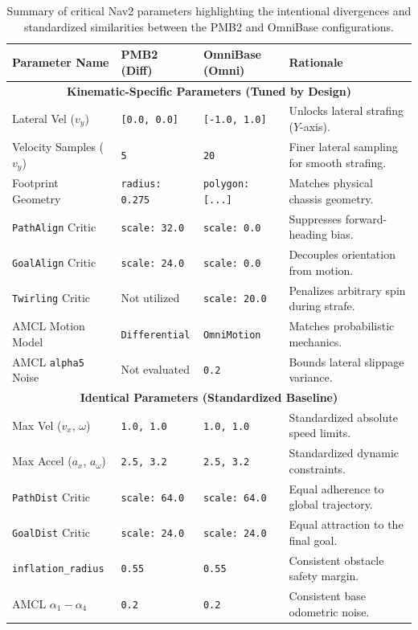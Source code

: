 \begin{table}[htbp]
    \centering
    \renewcommand{\arraystretch}{1.3}
    \caption{Summary of critical Nav2 parameters highlighting the intentional divergences and standardized similarities between the PMB2 and OmniBase configurations.}
    \vspace{0.2cm}
    \label{tab:nav2_params}
    \begin{tabularx}{\textwidth}{@{} l l l >{\raggedright\arraybackslash}X @{}}
        \toprule
        \textbf{Parameter Name} & \textbf{PMB2 (Diff)} & \textbf{OmniBase (Omni)} & \textbf{Rationale} \\
        \midrule
        \multicolumn{4}{c}{\textbf{Kinematic-Specific Parameters (Tuned by Design)}} \\
        \midrule
        Lateral Vel ($v_y$) & \texttt{[0.0, 0.0]} & \texttt{[-1.0, 1.0]} & Unlocks lateral strafing ($Y$-axis). \\
        Velocity Samples ($v_y$) & \texttt{5} & \texttt{20} & Finer lateral sampling for smooth strafing. \\
        Footprint Geometry & \texttt{radius: 0.275} & \texttt{polygon: [...]} & Matches physical chassis geometry. \\
        \texttt{PathAlign} Critic & \texttt{scale: 32.0} & \texttt{scale: 0.0} & Suppresses forward-heading bias. \\
        \texttt{GoalAlign} Critic & \texttt{scale: 24.0} & \texttt{scale: 0.0} & Decouples orientation from motion. \\
        \texttt{Twirling} Critic & Not utilized & \texttt{scale: 20.0} & Penalizes arbitrary spin during strafe. \\
        AMCL Motion Model & \texttt{Differential} & \texttt{OmniMotion} & Matches probabilistic mechanics. \\
        AMCL \texttt{alpha5} Noise & Not evaluated & \texttt{0.2} & Bounds lateral slippage variance. \\
        \midrule
        \multicolumn{4}{c}{\textbf{Identical Parameters (Standardized Baseline)}} \\
        \midrule
        Max Vel ($v_x$, $\omega$) & \texttt{1.0, 1.0} & \texttt{1.0, 1.0} & Standardized absolute speed limits. \\
        Max Accel ($a_x$, $a_\omega$) & \texttt{2.5, 3.2} & \texttt{2.5, 3.2} & Standardized dynamic constraints. \\
        \texttt{PathDist} Critic & \texttt{scale: 64.0} & \texttt{scale: 64.0} & Equal adherence to global trajectory. \\
        \texttt{GoalDist} Critic & \texttt{scale: 24.0} & \texttt{scale: 24.0} & Equal attraction to the final goal. \\
        \texttt{inflation\_radius} & \texttt{0.55} & \texttt{0.55} & Consistent obstacle safety margin. \\
        AMCL $\alpha_1 - \alpha_4$ & \texttt{0.2} & \texttt{0.2} & Consistent base odometric noise. \\
        \bottomrule
    \end{tabularx}
\end{table}